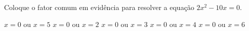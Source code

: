 Coloque o fator comum em evidência para resolver a equação $2x^2-10x=0$.

$x=0$ ou $x=5$
$x=0$ ou $x=2$
$x=0$ ou $x=3$
$x=0$ ou $x=4$
$x=0$ ou $x=6$


